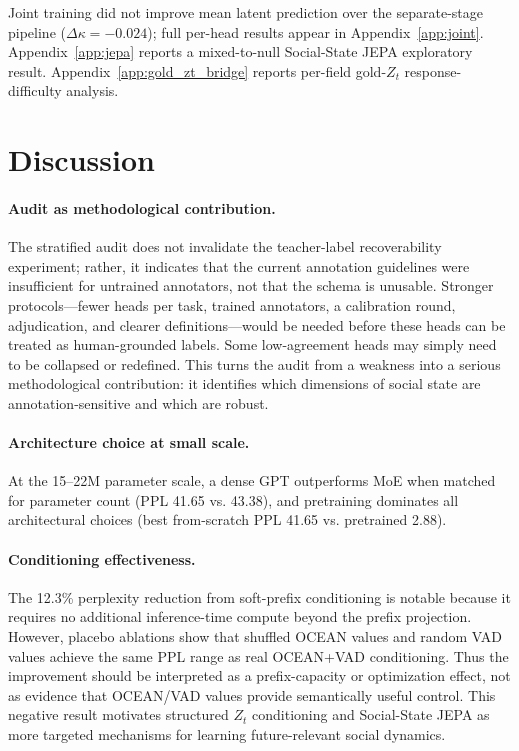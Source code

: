 \documentclass[11pt]{article}
\begin{document}
Joint training did not improve mean latent prediction over the separate-stage pipeline ($\Delta\kappa{=}-0.024$); full per-head results appear in Appendix~\ref{app:joint}.
Appendix~\ref{app:jepa} reports a mixed-to-null Social-State JEPA exploratory result.
Appendix~\ref{app:gold_zt_bridge} reports per-field gold-$Z_t$ response-difficulty analysis.

\section{Discussion}
\label{sec:discussion}

\paragraph{Audit as methodological contribution.}
The stratified audit does not invalidate the teacher-label recoverability experiment; rather, it indicates that the current annotation guidelines were insufficient for untrained annotators, not that the schema is unusable.
Stronger protocols---fewer heads per task, trained annotators, a calibration round, adjudication, and clearer definitions---would be needed before these heads can be treated as human-grounded labels.
Some low-agreement heads may simply need to be collapsed or redefined.
This turns the audit from a weakness into a serious methodological contribution: it identifies which dimensions of social state are annotation-sensitive and which are robust.

\paragraph{Architecture choice at small scale.}
At the 15--22M parameter scale, a dense GPT outperforms MoE when matched for parameter count (PPL 41.65 vs. 43.38), and pretraining dominates all architectural choices (best from-scratch PPL 41.65 vs. pretrained 2.88).

\paragraph{Conditioning effectiveness.}
The 12.3\% perplexity reduction from soft-prefix conditioning is notable because it requires no additional inference-time compute beyond the prefix projection.
However, placebo ablations show that shuffled OCEAN values and random VAD values achieve the same PPL range as real OCEAN+VAD conditioning.
Thus the improvement should be interpreted as a prefix-capacity or optimization effect, not as evidence that OCEAN/VAD values provide semantically useful control.
This negative result motivates structured $Z_t$ conditioning and Social-State JEPA as more targeted mechanisms for learning future-relevant social dynamics.
\end{document}
